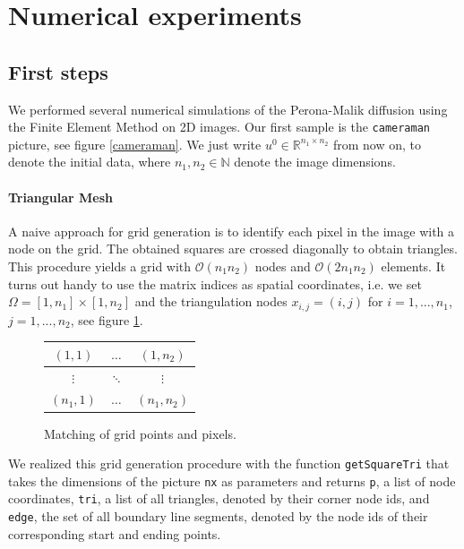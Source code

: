 \documentclass{report}
\renewcommand\O{\mathcal{O}}
\def\N{\mathbb{N}}
\def\R{\mathbb{R}}
\begin{document}
\section{Numerical experiments}

\subsection{First steps} 

We performed several numerical simulations of the Perona-Malik diffusion using the Finite Element Method on 2D images. Our first sample is the \texttt{cameraman} picture, see figure \ref{cameraman}. We just write $u^0 \in \R^{n_1 \times n_2}$ from now on, to denote the initial data, where $n_1, n_2 \in \N$ denote the image dimensions.

\paragraph{Triangular Mesh}

A naive approach for grid generation is to identify each pixel in the image with a node on the grid. The obtained squares are crossed diagonally to obtain triangles. This procedure yields a grid with $\O(n_1 n_2)$ nodes and $\O(2 n_1 n_2)$ elements. It turns out handy to use the matrix indices as spatial coordinates, i.e. we set $\Omega = [1,n_1] \times [1,n_2]$ and the triangulation nodes $x_{i,j} = (i,j)$ for $i=1,...,n_1$, $j=1,...,n_2$, see figure \ref{gridptpix}.
\begin{figure}[h]
	\centering
	\begin{tabular}{|c|c|c|}
		\hline		
		$(1,1)$ & $\hdots$ & $(1,n_2)$ \\ \hline
		$\vdots$ & $\ddots$ & $\vdots$ \\ \hline
		$(n_1,1)$ & $\hdots$ & $(n_1,n_2)$ \\ \hline
	\end{tabular}
	\caption{Matching of grid points and pixels.}
	\label{gridptpix}
\end{figure}

We realized this grid generation procedure with the function \texttt{getSquareTri} that takes the dimensions of the picture \texttt{nx} as parameters and returns \texttt{p}, a list of node coordinates, \texttt{tri}, a list of all triangles, denoted by their corner node ids, and \texttt{edge}, the set of all boundary line segments, denoted by the node ids of their corresponding start and ending points.
\end{document}

